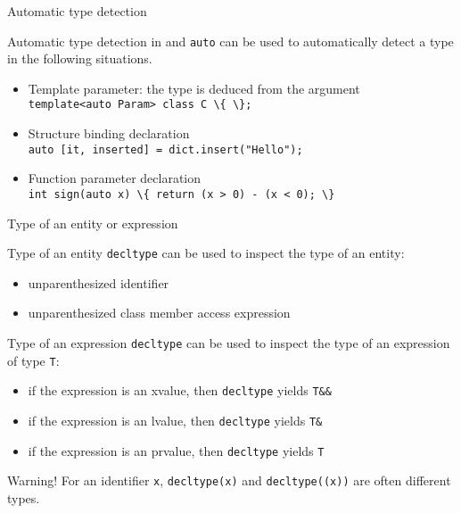 \begin{frame}{Automatic type detection}{}
  \begin{block}{Automatic type detection in  and }
    \lstinline!auto! can be used to automatically detect a type in the following situations.
    \begin{itemize}
    \item
      Template parameter: the type is deduced from the argument \\
      \lstinline!template<auto Param> class C \{ \};!
    \item
      Structure binding declaration \\
      \lstinline!auto [it, inserted] = dict.insert("Hello");!
    \item
      Function parameter declaration \\
      \lstinline!int sign(auto x) \{ return (x > 0) - (x < 0); \}!
    \end{itemize}
  \end{block}
\end{frame}

\begin{frame}{Type of an entity or expression}{}
  \begin{block}{Type of an entity}
    \lstinline!decltype! can be used to inspect the type of an entity:
    \begin{itemize}
    \item
      unparenthesized identifier
    \item
      unparenthesized class member access expression
    \end{itemize}
  \end{block}

  \begin{block}{Type of an expression}
    \lstinline!decltype! can be used to inspect the type of an expression of type \lstinline!T!:
    \begin{itemize}
    \item
      if the expression is an xvalue, then \lstinline!decltype! yields \lstinline!T&&!
    \item
      if the expression is an lvalue, then \lstinline!decltype! yields \lstinline!T&!
    \item
      if the expression is an prvalue, then \lstinline!decltype! yields \lstinline!T!
    \end{itemize}
  \end{block}

  \begin{block}{Warning!}
    For an identifier \lstinline!x!, \lstinline!decltype(x)! and \lstinline!decltype((x))! are often different types.
  \end{block}
\end{frame}

